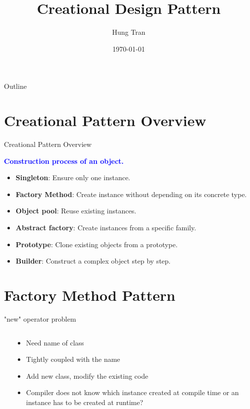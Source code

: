 \documentclass[13pt]{beamer}
\title[Design Pattern]{Creational Design Pattern}
\author{Hung Tran}
\institute{Fpt software}
\date{\today}
\begin{document}
\begin{frame}
  \titlepage
\end{frame}

\begin{frame}{Outline}
  \tableofcontents
\end{frame}

\section{Creational Pattern Overview}

\begin{frame}{Creational Pattern Overview}
	\begin{center}
	\textcolor{blue}{\textbf{Construction process of an object.}}
	\end{center}
	\begin{itemize}
		\setlength\itemsep{1em}
		\item \textbf{Singleton}: Ensure only one instance.
		\item \textbf{Factory Method}: Create instance without depending on its concrete type.
		\item \textbf{Object pool}: Reuse existing instances.
		\item \textbf{Abstract factory}: Create instances from a specific family.
		\item \textbf{Prototype}: Clone existing objects from a prototype.
		\item \textbf{Builder}: Construct a complex object step by step.
	\end{itemize}
\end{frame}

\section{Factory Method Pattern}

\begin{frame}{"new" operator problem}
\begin{columns}[T]
\begin{column}{.48\textwidth}
\lstset{basicstyle=\tiny,style=myCustomCppStyle}

\end{column}
\begin{column}{.48\textwidth}
	\begin{itemize}
		\setlength\itemsep{1em}
		\item Need name of class
		\item Tightly coupled with the name
		\item Add new class, modify the existing code
		\item Compiler does not know which instance created at compile time or an instance has to be created at runtime?
	\end{itemize}
\end{column}
\end{columns}
\end{frame}
\end{document}
